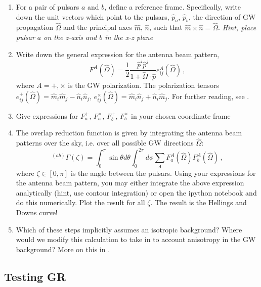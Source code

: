 \documentclass[article, onecolumn, ,nofootinbib,nopreprintnumbers]{revtex4}
\begin{document}
\begin{enumerate}
\item For a pair of pulsars $a$ and $b$, define a reference frame. Specifically, write down the unit vectors which point to the pulsars, $\hat{p}_a$, $\hat{p}_b$, the direction of GW propagation $\hat{\Omega}$ and the principal axes $\hat m$, $\hat n$, such that $\hat m\times \hat n = \hat \Omega$.  {\it Hint, place pulsar $a$ on the z-axis and $b$ in the x-z plane}

\item Write down the general expression for the antenna beam pattern, 
\begin{equation}
F^A(\hat \Omega) = \frac{1}{2} \frac{\hat p^i \hat p^j}{1+\hat\Omega\cdot\hat p} e^A_{ij}(\hat\Omega) \, ,  
\end{equation}
where $A=+,\times$ is the GW polarization. The polarization tensors $e^+_{ij}(\hat \Omega) = \hat m_i\hat m_j - \hat n_i \hat n_j$, $e^\times_{ij} (\hat \Omega)= \hat m_i \hat n_j + \hat n_i \hat m_j$. For further reading, see \cite{AllenRomano:1999, Anholm:09}. 


\item Give expressions for $F^+_a$, $F^\times_a$, $F^+_b$, $F^\times_b$ in your chosen coordinate frame
\item The overlap reduction function is given by integrating the antenna beam patterns over the sky, i.e. over all possible GW directions $\hat \Omega$:
\begin{equation}
^{(ab)}\Gamma(\zeta)=\int_0^\pi  \sin\theta d\theta \int_0^{2\pi} d\phi  \sum_A F^A_a(\hat \Omega) F^A_b(\hat \Omega) \, ,
\end{equation}
where $\zeta \in [0,\pi] $ is the angle between the pulsars. Using your expressions for the antenna beam pattern, you may either integrate the above expression analytically (hint, use contour integration) or open the ipython notebook and do this numerically. Plot the result for all $\zeta$. The result is the Hellings and Downs curve! 

\item Which of these steps implicitly assumes an isotropic background? Where would we modify this calculation to take in to account anisotropy in the GW background? More on this in \cite{MingarelliEtAl:2013}.
\end{enumerate}



\subsection{Testing GR}
\end{document}
